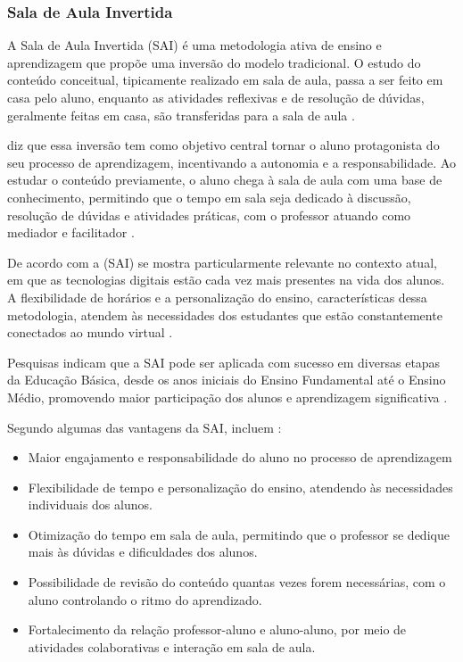 \subsubsection{Sala de Aula Invertida}

A Sala de Aula Invertida (SAI) é uma metodologia ativa de ensino e aprendizagem que propõe uma inversão do modelo tradicional. O estudo do conteúdo conceitual, tipicamente realizado em sala de aula, passa a ser feito em casa pelo aluno, enquanto as atividades reflexivas e de resolução de dúvidas, geralmente feitas em casa, são transferidas para a sala de aula \cite{Bergmann_2016}.

\cite{Pavanelo_2017} diz que essa inversão tem como objetivo central tornar o aluno protagonista do seu processo de aprendizagem, incentivando a autonomia e a responsabilidade. Ao estudar o conteúdo previamente, o aluno chega à sala de aula com uma base de conhecimento, permitindo que o tempo em sala seja dedicado à discussão, resolução de dúvidas e atividades práticas, com o professor atuando como mediador e facilitador .

De acordo com \cite{Pavanelo_2017} a (SAI) se mostra particularmente relevante no contexto atual, em que as tecnologias digitais estão cada vez mais presentes na vida dos alunos. A flexibilidade de horários e a personalização do ensino, características dessa metodologia, atendem às necessidades dos estudantes que estão constantemente conectados ao mundo virtual .

Pesquisas indicam que a SAI pode ser aplicada com sucesso em diversas etapas da Educação Básica, desde os anos iniciais do Ensino Fundamental até o Ensino Médio, promovendo maior participação dos alunos e aprendizagem significativa \cite{Muraro_2019,Sanches_2019}.

Segundo \cite{Bergmann_2016} algumas das vantagens da SAI, incluem :
\begin{itemize}
\item Maior engajamento e responsabilidade do aluno no processo de aprendizagem 
\item Flexibilidade de tempo e personalização do ensino, atendendo às necessidades individuais dos alunos.
\item Otimização do tempo em sala de aula, permitindo que o professor se dedique mais às dúvidas e dificuldades dos alunos.
\item Possibilidade de revisão do conteúdo quantas vezes forem necessárias, com o aluno controlando o ritmo do aprendizado.
\item Fortalecimento da relação professor-aluno e aluno-aluno, por meio de atividades colaborativas e interação em sala de aula.    
\end{itemize}

